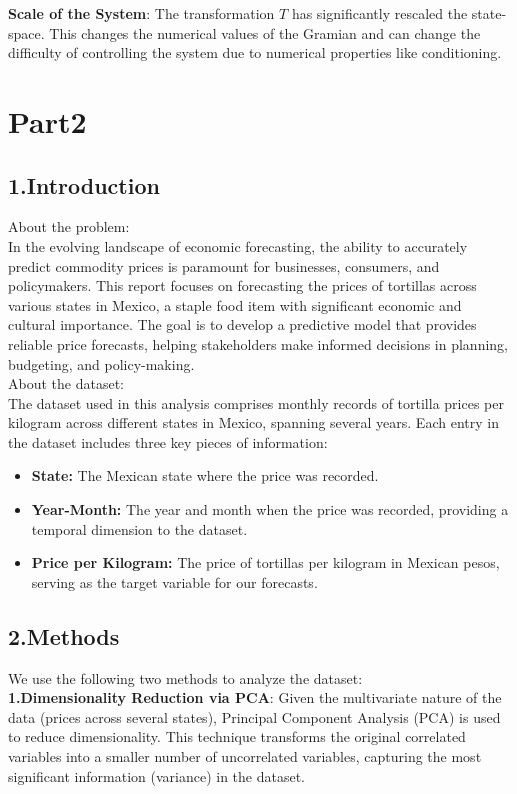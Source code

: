 \documentclass[12pt]{article}
\begin{document}
\textbf{Scale of the System}: The transformation $T$ has significantly rescaled the state-space. This changes the numerical values of the Gramian and can change the difficulty of controlling the system due to numerical properties like conditioning.


\newpage
\section*{Part2}
\subsection*{1.Introduction}
About the problem:\\
In the evolving landscape of economic forecasting, the ability to accurately predict commodity prices is paramount for businesses, consumers, and policymakers. This report focuses on forecasting the prices of tortillas across various states in Mexico, a staple food item with significant economic and cultural importance. The goal is to develop a predictive model that provides reliable price forecasts, helping stakeholders make informed decisions in planning, budgeting, and policy-making.\cite{syerramilli2023}\\

About the dataset:\\
The dataset used in this analysis comprises monthly records of tortilla prices per kilogram across different states in Mexico, spanning several years. Each entry in the dataset includes three key pieces of information:
\begin{itemize}
\item \textbf{State:} The Mexican state where the price was recorded.
\item \textbf{Year-Month:} The year and month when the price was recorded, providing a temporal dimension to the dataset.
\item \textbf{Price per Kilogram:} The price of tortillas per kilogram in Mexican pesos, serving as the target variable for our forecasts.
\end{itemize}

\subsection*{2.Methods}
We use the following two methods to analyze the dataset:\\
\textbf{1.Dimensionality Reduction via PCA}: Given the multivariate nature of the data (prices across several states), Principal Component Analysis (PCA) is used to reduce dimensionality. This technique transforms the original correlated variables into a smaller number of uncorrelated variables, capturing the most significant information (variance) in the dataset.\\
\end{document}
